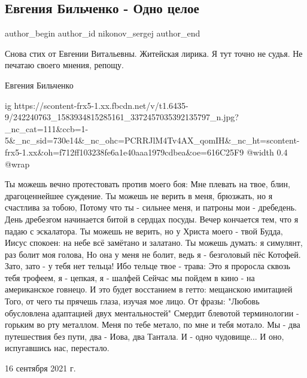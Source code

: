  
 
 
 
 
 
\subsection{Евгения Бильченко - Одно целое}
\label{sec:18_09_2021.fb.nikonov_sergej.7.bilchenko_odno_celoje}
 
\ifcmt
 author_begin
   author_id nikonov_sergej
 author_end
\fi

Снова стих от Евгении Витальевны. Житейская лирика. Я тут точно не судья. Не печатаю своего мнения, репощу. 

Евгения Бильченко


\ifcmt
  ig https://scontent-frx5-1.xx.fbcdn.net/v/t1.6435-9/242240763_1583934815285161_3372457035392135797_n.jpg?_nc_cat=111&ccb=1-5&_nc_sid=730e14&_nc_ohc=PCRRJlM4Tv4AX_qomIH&_nc_ht=scontent-frx5-1.xx&oh=f712ff103238fe6a1e40aaa1979cdbea&oe=616C25F9
  @width 0.4
  @wrap 
\fi

\obeycr
Ты можешь вечно протестовать против моего боя:
Мне плевать на твое, блин, драгоценнейшее суждение.
Ты можешь не верить в меня, брюзжать, но я счастлива за тобою,
Потому что ты - сильнее меня, и патроны мои - дребедень.
День дребезгом начинается битой в сердцах посуды.
Вечер кончается тем, что я падаю с эскалатора.
Ты можешь не верить, но у Христа моего - твой Будда,
Иисус спокоен: на небе всё замётано и залатано.
Ты можешь думать: я симулянт, раз болит моя голова,
Но она у меня не болит, ведь я - безголовый пёс Котофей.
Зато, зато - у тебя нет тельца! Ибо тельце твое - трава:
Это я проросла сквозь тебя трофеем, я - цепкая, я - шалфей
Сейчас мы пойдем в кино - на американское говнецо.
И это будет восстанием в гетто: мещанскою имитацией
Того, от чего ты прячешь глаза, изучая мое лицо.
От фразы: "Любовь обусловлена адаптацией двух ментальностей" \textendash
Смердит блевотой терминологии - горьким во рту металлом.
Меня по тебе метало, по мне и тебя мотало.
Мы - два путешествия без пути, два - Иова, два Тантала.
И - одно чудовище...
И оно, испугавшись нас, перестало.
\restorecr

16 сентября 2021 г.
